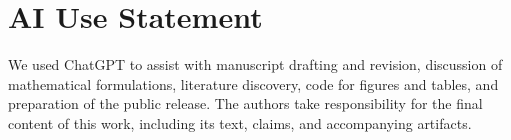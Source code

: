 \section*{AI Use Statement}

We used ChatGPT to assist with manuscript drafting and revision, discussion of mathematical formulations, literature discovery, code for figures and tables, and preparation of the public release. The authors take responsibility for the final content of this work, including its text, claims, and accompanying artifacts.
